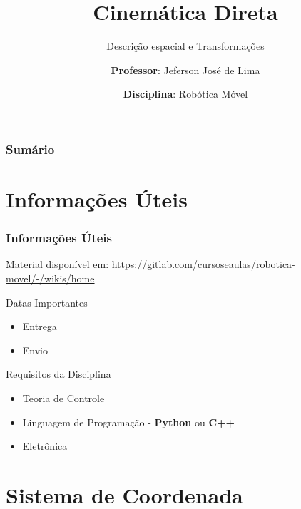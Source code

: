 \documentclass[t]{beamer}
\title[\textit{Introdução à robótica móvel}]{
  Cinemática Direta}
\subtitle{Descrição espacial e Transformações}
\author[Professor: Jeferson José de Lima]{
	\textbf{Professor}: Jeferson José de Lima}
\institute[UTFPR-PB]{
  Departamento de Informática (DAINF)}
\date[2017.1]{\textbf{Disciplina}: Robótica Móvel}
\newcommand{\pausar}{\pause}
\begin{document}
\begin{frame}
  \titlepage
\end{frame}

\begin{frame}
	\frametitle{Sumário}
	{\small {\small \tableofcontents}}
\end{frame}


\section{Informações Úteis}
\begin{frame} 
	\frametitle{Informações Úteis}
	\begin{block}{Material disponível em:}
		\href{Robótica Móvel - Wiki}{https://gitlab.com/cursoseaulas/robotica-movel/-/wikis/home}
	\end{block}
	\pausar
	\begin{alertblock}{Datas Importantes}
		\begin{itemize}
		\item Entrega
		\item Envio
		\end{itemize}
	\end{alertblock}
	\pausar
	\begin{exampleblock}{Requisitos da Disciplina}
		\begin{itemize}
		\item Teoria de Controle
		\item Linguagem de Programação - \textbf{Python} ou \textbf{C++}
		\item Eletrônica
		\end{itemize}
	\end{exampleblock}
\end{frame}

\section{Sistema de Coordenada}
\end{document}
